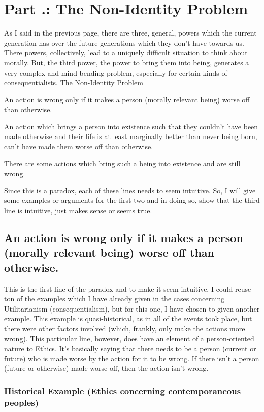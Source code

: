 \section{Part \thechapcount.\theseccount: The Non-Identity Problem}
As I said in the previous page, there are three, general, powers which the current generation has over the future generations which they don't have towards us. There powers, collectively, lead to a uniquely difficult situation to think about morally. But, the third power, the power to bring them into being, generates a very complex and mind-bending problem, especially for certain kinds of consequentialists. 
The Non-Identity Problem
\begin{earg}
    \item[] An action is wrong only if it makes a person (morally relevant being) worse off than otherwise.
    \item[] An action which brings a person into existence such that they couldn’t have been made otherwise and their life is at least marginally better than never being born, can’t have made them worse off than otherwise.
    \item[] There are some actions which bring such a being into existence and are still wrong.
\end{earg}
Since this is a paradox, each of these lines needs to seem intuitive. So, I will give some examples or arguments for the first two and in doing so, show that the third line is intuitive, just makes sense or seems true. 
\subsection{An action is wrong only if it makes a person (morally relevant being) worse off than otherwise.}

This is the first line of the paradox and to make it seem intuitive, I could reuse ton of the examples which I have already given in the cases concerning Utilitarianism (consequentialism), but for this one, I have chosen to given another example. This example is quasi-historical, as in all of the events took place, but there were other factors involved (which, frankly, only make the actions more wrong). This particular line, however, does have an element of a person-oriented nature to Ethics. It's basically saying that there needs to be a person (current or future) who is made worse by the action for it to be wrong. If there isn't a person (future or otherwise) made worse off, then the action isn't wrong. 
\subsubsection{Historical Example (Ethics concerning contemporaneous peoples)}

